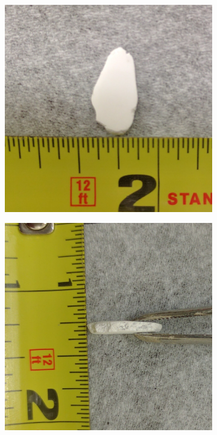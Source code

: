 \documentclass[%
 reprint,
 amsmath,amssymb,
 aps,
 pra,
]{revtex4-1}
\begin{document}
\begin{figure}[H]
	\centering
	\begin{subfigure}{0.22\textwidth}
		\includegraphics[width=1\textwidth]{sample_area.jpg}
		\caption{}
		\label{fig:sample:area}
	\end{subfigure}
	\begin{subfigure}{0.22\textwidth}
		\includegraphics[width=\textwidth,angle=90]{sample_thickness.jpg} 

\end{subfigure}
\end{figure}
\end{document}
